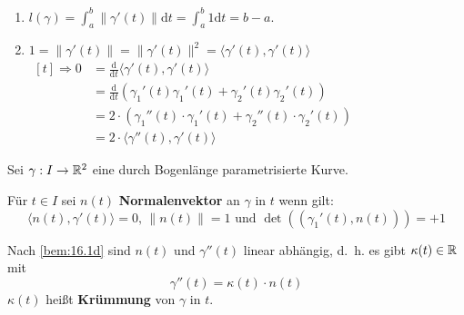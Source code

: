 \begin{beweis}\leavevmode
    \begin{enumerate}[label=\alph*)]
        \item $l(\gamma) = \int_a^b \|\gamma'(t)\| \mathrm{d} t = \int_a^b 1 \mathrm{d} t = b - a$.
        \item  $1 = \|\gamma'(t)\| = \|\gamma'(t)\|^2 = \langle \gamma'(t), \gamma'(t) \rangle$\\
            $\begin{aligned}[t]
                \Rightarrow 0 &= \frac{\mathrm{d}}{\mathrm{d}t} \langle \gamma'(t), \gamma'(t) \rangle\\
                              &= \frac{\mathrm{d}}{\mathrm{d}t} (\gamma_1'(t)\gamma_1'(t) + \gamma_2'(t)\gamma_2'(t))\\
                              &= 2 \cdot (\gamma_1''(t) \cdot \gamma_1'(t) + \gamma_2''(t) \cdot \gamma_2'(t))\\
                              &= 2 \cdot \langle \gamma''(t), \gamma'(t) \rangle
             \end{aligned}$
    \end{enumerate}
\end{beweis}

\begin{definition}%
    Sei $\gamma: I \rightarrow \mathbb{R}^2$ eine durch Bogenlänge
    parametrisierte Kurve.

    \begin{defenum}
        \item Für $t \in I$ sei $n(t)$ \textbf{Normalenvektor}
              an $\gamma$ in $t$ wenn gilt:
              \[\langle n(t), \gamma'(t) \rangle = 0 \text{, } \|n(t)\|=1 \text{ und } \det((\gamma_1'(t), n(t))) = +1\]
        \item Nach \cref{bem:16.1d} sind $n(t)$ und $\gamma''(t)$ linear
              abhängig, d.~h. es gibt $\kappa(t) \in \mathbb{R}$ mit
              \[\gamma''(t) = \kappa(t) \cdot n(t)\]
              $\kappa(t)$ heißt \textbf{Krümmung}
              von $\gamma$ in $t$.
    \end{defenum}
\end{definition}

